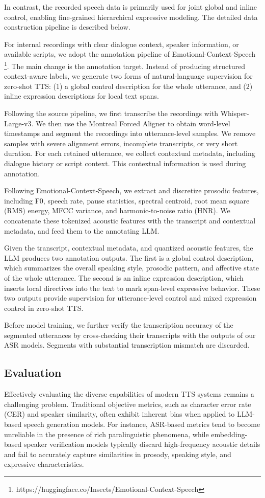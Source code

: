 \documentclass{llmxive}
\begin{document}
In contrast, the recorded speech data is primarily used for joint global and inline control, enabling fine-grained hierarchical expressive modeling. The detailed data construction pipeline is described below.

For internal recordings with clear dialogue context, speaker information, or available scripts, we adopt the annotation pipeline of Emotional-Context-Speech \footnote{https://huggingface.co/Insects/Emotional-Context-Speech}. The main change is the annotation target. Instead of producing structured context-aware labels, we generate two forms of natural-language supervision for zero-shot TTS: (1) a global control description for the whole utterance, and (2) inline expression descriptions for local text spans.

Following the source pipeline, we first transcribe the recordings with Whisper-Large-v3. We then use the Montreal Forced Aligner to obtain word-level timestamps and segment the recordings into utterance-level samples. We remove samples with severe alignment errors, incomplete transcripts, or very short duration. For each retained utterance, we collect contextual metadata, including dialogue history or script context. This contextual information is used during annotation.

Following Emotional-Context-Speech, we extract and discretize prosodic features, including F0, speech rate, pause statistics, spectral centroid, root mean square (RMS) energy, MFCC variance, and harmonic-to-noise ratio (HNR). We concatenate these tokenized acoustic features with the transcript and contextual metadata, and feed them to the annotating LLM.

Given the transcript, contextual metadata, and quantized acoustic features, the LLM produces two annotation outputs. The first is a global control description, which summarizes the overall speaking style, prosodic pattern, and affective state of the whole utterance. The second is an inline expression description, which inserts local directives into the text to mark span-level expressive behavior. These two outputs provide supervision for utterance-level control and mixed expression control in zero-shot TTS.

Before model training, we further verify the transcription accuracy of the segmented utterances by cross-checking their transcripts with the outputs of our ASR models. Segments with substantial transcription mismatch are discarded.


\subsection{Evaluation}
Effectively evaluating the diverse capabilities of modern TTS systems remains a challenging problem. Traditional objective metrics, such as character error rate (CER) and speaker similarity, often exhibit inherent bias when applied to LLM-based speech generation models. For instance, ASR-based metrics tend to become unreliable in the presence of rich paralinguistic phenomena, while embedding-based speaker verification models typically discard high-frequency acoustic details and fail to accurately capture similarities in prosody, speaking style, and expressive characteristics.
\end{document}
